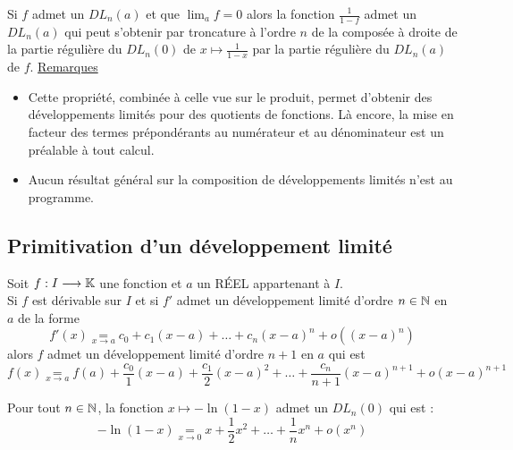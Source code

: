 \begin{defprop}
    Si \(f\) admet un \(DL_n(a)\) et que \(\lim_{a} f = 0\) alors la fonction \(\frac{1}{1 - f}\) admet un \(DL_n(a)\) qui peut s’obtenir par troncature à l’ordre \(n\) de la composée à droite de la partie régulière du \(DL_n(0)\) de \(x \mapsto  \frac{1}{1 - x}\) par la partie régulière du \(DL_n(a)\) de \(f\).
    \underline{Remarques}
    \begin{itemize}
    \item Cette propriété, combinée à celle vue sur le produit, permet d’obtenir des développements limités pour des quotients de fonctions. Là encore, la mise en facteur des termes prépondérants au numérateur et au dénominateur est un préalable à tout calcul.
    \item Aucun résultat général sur la composition de développements limités n’est au programme.
    \end{itemize}
\end{defprop}
\subsection{Primitivation d’un développement limité}

\begin{theo}
    Soit \(f : I \longrightarrow  \mathbb{K}\) une fonction et \(a\) un RÉEL appartenant à \(I\).\\
    Si \(f\) est dérivable sur \(I\) et si \(f '\) admet un développement limité d’ordre \(n \in  \mathbb{N}\) en \(a\) de la forme
    \[f '(x) \underset{x\to a}{=} c_0 + c_1(x - a) + \dots + c_n(x - a)^n + o ((x - a)^n)\]
    alors \(f\) admet un développement limité d’ordre \(n + 1\) en \(a\) qui est
    \[f (x) \underset{x\to a}{=} f (a) + \frac{c_0}{1} (x - a) + \frac{c_1}{2} (x - a)^2 + \dots + \frac{c_n}{n + 1}(x - a)^{n+1} + o (x - a)^{n+1}\]
\end{theo}
\begin{defprop}
    Pour tout \(n \in  \mathbb{N}\), la fonction \(x \mapsto  - \ln(1 - x)\) admet un \(DL_n(0)\) qui est :
    \[- \ln(1 - x) \underset{x \to 0}{=} x + \frac{1}{2}x^2 + \dots + \frac{1}{n}x^n + o(x^n)\]
\end{defprop}

